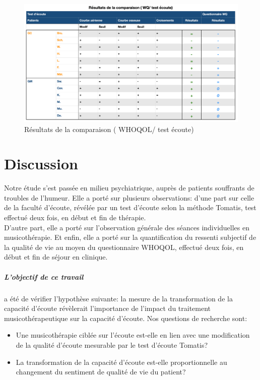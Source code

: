   \begin{figure}
  	\centering
  	\includegraphics[width=0.7\columnwidth]{images/graphiques/comparaison_pre_post.png}
  	\caption[Résultats de la comparaison ( WHOQOL/ test écoute)]{Résultats de la comparaison ( 
  	WHOQOL/ test 
  	écoute)}
  	
  \end{figure}
   
  
  
\chapter{Discussion}
\label{Conclusions}

Notre étude s'est passée  en milieu psychiatrique, 
auprès de patients souffrants de troubles de l'humeur.
Elle a porté sur plusieurs observations: d'une part sur celle de la faculté d'écoute, révélée par un test 
d'écoute selon la méthode Tomatis, test effectué deux fois, en début et fin de thérapie.
\\
D'autre part, elle a porté sur l'observation générale des séances individuelles en musicothérapie.
Et enfin, elle a porté sur la quantification du ressenti subjectif de la qualité de vie au moyen du 
questionnaire WHOQOL, effectué deux fois, en début et fin de séjour en clinique.


\paragraph{L'objectif de ce travail} a été de vérifier l'hypothèse suivante: 
	 la  mesure de la  transformation de la capacité d'écoute révèlerait  l'importance de l'impact  du 
	 traitement 
musicothérapeutique sur la capacité d'écoute.
Nos questions de recherche sont: 
\begin{itemize}
	\item Une musicothérapie ciblée sur l'écoute  est-elle en lien avec une modification de la qualité 
	d'écoute 
	mesurable par le test d'écoute Tomatis?
	\item La transformation de la capacité d'écoute est-elle  proportionnelle au changement 
	du sentiment de qualité de vie du patient?
\end{itemize}





